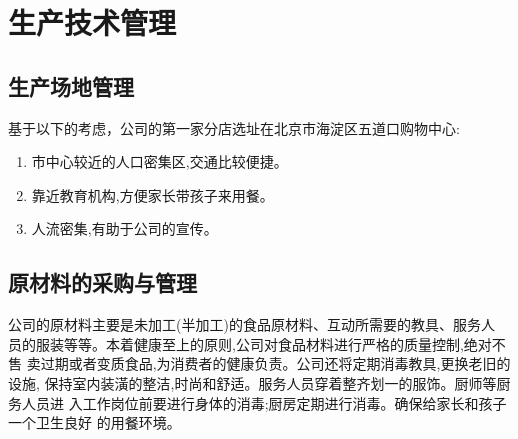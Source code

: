 \section{生产技术管理}

\subsection{生产场地管理}
基于以下的考虑，公司的第一家分店选址在北京市海淀区五道口购物中心:
\begin{enumerate}
                \item 市中心较近的人口密集区,交通比较便捷。
                \item 靠近教育机构,方便家长带孩子来用餐。
                \item 人流密集,有助于公司的宣传。
\end{enumerate}

\subsection{原材料的采购与管理}
公司的原材料主要是未加工(半加工)的食品原材料、互动所需要的教具、服务人
员的服装等等。本着健康至上的原则,公司对食品材料进行严格的质量控制,绝对不售
卖过期或者变质食品,为消费者的健康负责。公司还将定期消毒教具,更换老旧的设施,
保持室内装潢的整洁,时尚和舒适。服务人员穿着整齐划一的服饰。厨师等厨务人员进
入工作岗位前要进行身体的消毒;厨房定期进行消毒。确保给家长和孩子一个卫生良好
的用餐环境。

